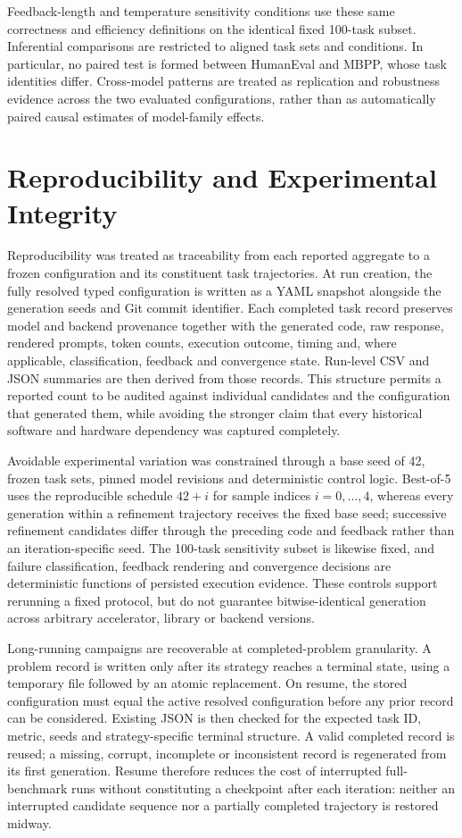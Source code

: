 Feedback-length and temperature sensitivity conditions use these same correctness and efficiency definitions on the identical fixed 100-task subset. Inferential comparisons are restricted to aligned task sets and conditions. In particular, no paired test is formed between HumanEval and MBPP, whose task identities differ. Cross-model patterns are treated as replication and robustness evidence across the two evaluated configurations, rather than as automatically paired causal estimates of model-family effects.

\section{Reproducibility and Experimental Integrity}
\label{sec:reproducibility-integrity}

Reproducibility was treated as traceability from each reported aggregate to a frozen configuration and its constituent task trajectories. At run creation, the fully resolved typed configuration is written as a YAML snapshot alongside the generation seeds and Git commit identifier. Each completed task record preserves model and backend provenance together with the generated code, raw response, rendered prompts, token counts, execution outcome, timing and, where applicable, classification, feedback and convergence state. Run-level CSV and JSON summaries are then derived from those records. This structure permits a reported count to be audited against individual candidates and the configuration that generated them, while avoiding the stronger claim that every historical software and hardware dependency was captured completely.

Avoidable experimental variation was constrained through a base seed of 42, frozen task sets, pinned model revisions and deterministic control logic. Best-of-5 uses the reproducible schedule $42+i$ for sample indices $i=0,\ldots,4$, whereas every generation within a refinement trajectory receives the fixed base seed; successive refinement candidates differ through the preceding code and feedback rather than an iteration-specific seed. The 100-task sensitivity subset is likewise fixed, and failure classification, feedback rendering and convergence decisions are deterministic functions of persisted execution evidence. These controls support rerunning a fixed protocol, but do not guarantee bitwise-identical generation across arbitrary accelerator, library or backend versions.

Long-running campaigns are recoverable at completed-problem granularity. A problem record is written only after its strategy reaches a terminal state, using a temporary file followed by an atomic replacement. On resume, the stored configuration must equal the active resolved configuration before any prior record can be considered. Existing JSON is then checked for the expected task ID, metric, seeds and strategy-specific terminal structure. A valid completed record is reused; a missing, corrupt, incomplete or inconsistent record is regenerated from its first generation. Resume therefore reduces the cost of interrupted full-benchmark runs without constituting a checkpoint after each iteration: neither an interrupted candidate sequence nor a partially completed trajectory is restored midway.

